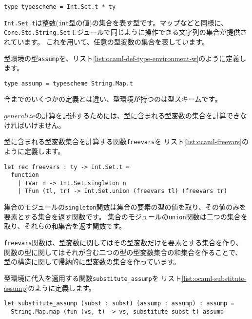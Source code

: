 \begin{lstlisting}[caption=型スキームの定義, label=list:ocaml-def-type-scheme]
type typescheme = Int.Set.t * ty
\end{lstlisting}

\texttt{Int.Set.t}は整数(\texttt{int}型の値)の集合を表す型です。マップなどと同様に、
\texttt{Core.Std.String.Set}モジュールで同じように操作できる文字列の集合が提供されています。
これを用いて、任意の型変数の集合を表しています。

型環境の型\texttt{assump}を、リスト\ref{list:ocaml-def-type-environment-w}のように定義します。

\begin{lstlisting}[caption=型環境の定義, label=list:ocaml-def-type-environment-w]
type assump = typescheme String.Map.t
\end{lstlisting}

今までのいくつかの定義とは違い、型環境が持つのは型スキームです。

$\mathit{generalize}$の計算を記述するためには、型に含まれる型変数の集合を計算できなければいけません。

型に含まれる型変数集合を計算する関数\texttt{freevars}を
リスト\ref{list:ocaml-freevars}のように定義します。

\begin{lstlisting}[caption=型に含まれる型変数集合の計算, label=list:ocaml-freevars]
let rec freevars : ty -> Int.Set.t =
  function
    | TVar n -> Int.Set.singleton n
    | TFun (tl, tr) -> Int.Set.union (freevars tl) (freevars tr)
\end{lstlisting}

集合のモジュールの\texttt{singleton}関数は集合の要素の型の値を取り、その値のみを要素とする集合を返す関数です。
集合のモジュールの\texttt{union}関数は二つの集合を取り、それらの和集合を返す関数です。

\texttt{freevars}関数は、型変数に関してはその型変数だけを要素とする集合を作り、
関数の型に関してはそれが含む二つの型の型変数集合の和集合を作ることで、
型の構造に関して帰納的に型変数の集合を作っています。

型環境に代入を適用する関数\texttt{substitute\_assump}を
リスト\ref{list:ocaml-substitute-assump}のように定義します。

\begin{lstlisting}[caption=型環境に代入を適用, label=list:ocaml-substitute-assump]
let substitute_assump (subst : subst) (assump : assump) : assump =
  String.Map.map (fun (vs, t) -> vs, substitute subst t) assump
\end{lstlisting}

